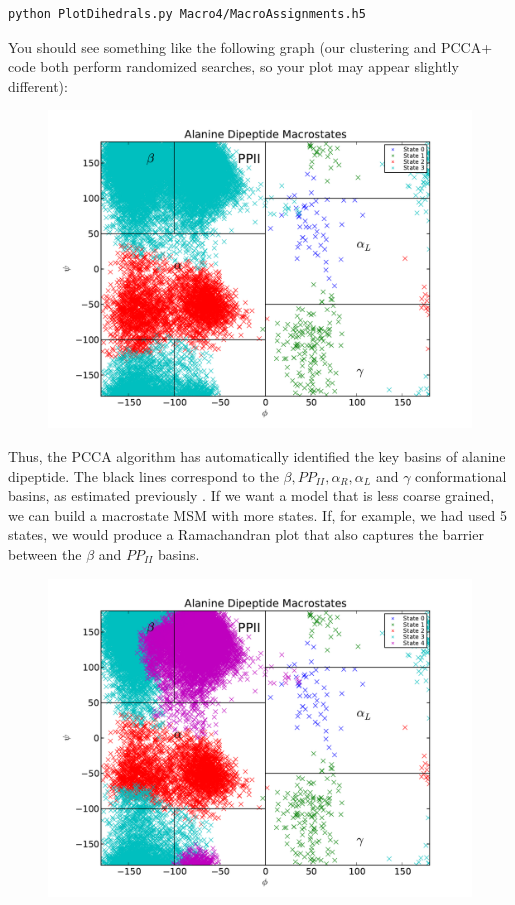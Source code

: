 \documentclass[12pt]{article}
\begin{document}
\begin{verbatim}
python PlotDihedrals.py Macro4/MacroAssignments.h5
\end{verbatim}

You should see something like the following graph (our clustering and PCCA+ code both perform randomized searches, so your plot may appear slightly different):
\begin{figure}
\begin{center}
\includegraphics[width=11.7cm]{figures/Macro4}
\end{center}
\end{figure}


Thus, the PCCA algorithm has automatically identified the key basins of alanine dipeptide.  The black lines correspond to the $\beta, PP_{II}, \alpha_R, \alpha_L$ and $\gamma$ conformational basins, as estimated previously \cite{Jha2005}.  If we want a model that is less coarse grained, we can build a macrostate MSM with more states.  If, for example, we had used 5 states, we would produce a Ramachandran plot that also captures the barrier between the $\beta$ and $PP_{II}$ basins.  
\begin{figure}
\begin{center}
\includegraphics[width=11.7cm]{figures/Macro5}
\end{center}
\end{figure}
\end{document}
